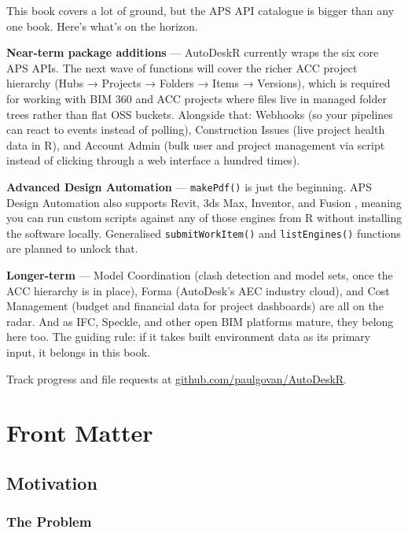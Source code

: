 \documentclass[
  11pt,
  letterpaper,
  DIV=11,
  numbers=noendperiod]{scrreprt}
\begin{document}

This book covers a lot of ground, but the APS API catalogue is bigger
than any one book. Here's what's on the horizon.

\textbf{Near-term package additions} --- AutoDeskR currently wraps the
six core APS APIs. The next wave of functions will cover the richer ACC
project hierarchy (Hubs → Projects → Folders → Items → Versions), which
is required for working with BIM 360 and ACC projects where files live
in managed folder trees rather than flat OSS buckets. Alongside that:
Webhooks (so your pipelines can react to events instead of polling),
Construction Issues (live project health data in R), and Account Admin
(bulk user and project management via script instead of clicking through
a web interface a hundred times).

\textbf{Advanced Design Automation} --- \texttt{makePdf()} is just the
beginning. APS Design Automation also supports Revit, 3ds Max, Inventor,
and Fusion , meaning you can run custom scripts against any of those
engines from R without installing the software locally. Generalised
\texttt{submitWorkItem()} and \texttt{listEngines()} functions are
planned to unlock that.

\textbf{Longer-term} --- Model Coordination (clash detection and model
sets, once the ACC hierarchy is in place), Forma (AutoDesk's AEC
industry cloud), and Cost Management (budget and financial data for
project dashboards) are all on the radar. And as IFC, Speckle, and other
open BIM platforms mature, they belong here too. The guiding rule: if it
takes built environment data as its primary input, it belongs in this
book.

Track progress and file requests at
\href{https://github.com/paulgovan/AutoDeskR}{github.com/paulgovan/AutoDeskR}.

\part{Front Matter}

\chapter*{Motivation}\label{motivation}


\section*{The Problem}\label{the-problem}
\end{document}
